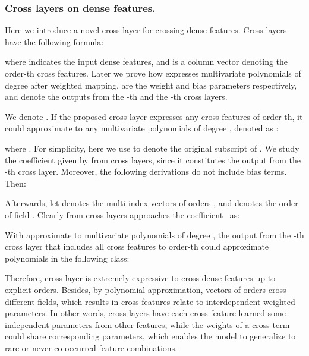 \documentclass[letterpaper]{article} \usepackage{aaai21}  \usepackage{times}  \usepackage{helvet} \usepackage{courier}  \usepackage[hyphens]{url}  \usepackage{graphicx} \urlstyle{rm} \def\UrlFont{\rm}  \usepackage{natbib}  \usepackage{caption} \frenchspacing  \setlength{\pdfpagewidth}{8.5in}  \setlength{\pdfpageheight}{11in}  \usepackage{graphicx}
\begin{document}
\subsubsection{Cross layers on dense features.}
Here we introduce a novel cross layer for crossing dense features. Cross layers have the following formula: 
\begin{small}

 \end{small}where  indicates the input dense features, and  is a column vector denoting the order-th cross features. Later we prove how  expresses multivariate polynomials of degree  after weighted mapping.  are the weight and bias parameters respectively, and  denote the outputs from the -th and the -th cross layers.

We denote . If the proposed cross layer expresses any cross features of order-th, it could approximate to any multivariate polynomials of degree , denoted as : 
\begin{small}
\end{small}where . For simplicity, here we use  to denote the original subscript of . We study the coefficient  given by  from cross layers, since it constitutes the output  from the -th cross layer. Moreover, the following derivations do not include bias terms. Then: 
\begin{small}

\end{small}Afterwards, let  denotes the multi-index vectors of orders , and  denotes the order of field . Clearly  from cross layers approaches the coefficient ~as: 
\begin{small}

\end{small}With  approximate to multivariate polynomials of degree , the output  from the -th cross layer that includes all cross features to order-th could approximate polynomials in the following class: 
\begin{small}

\end{small}

Therefore, cross layer is extremely expressive to cross dense features up to explicit orders. Besides, by polynomial approximation, vectors of orders cross different fields, which results in cross features relate to interdependent weighted parameters. In other words, cross layers have each cross feature learned some independent parameters from other features, while the weights of a cross term could share corresponding parameters, which enables the model to generalize to rare or never co-occurred feature combinations.
\end{document}
